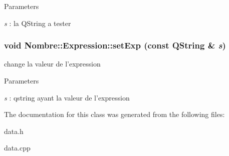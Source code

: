 \begin{DoxyParams}{Parameters}
\item[{\em s}]: la QString a tester \end{DoxyParams}
\hypertarget{classNombre_1_1Expression_a8e3eec9d859922798be932da57e5ce6e}{
\subsubsection[{setExp}]{\setlength{\rightskip}{0pt plus 5cm}void Nombre::Expression::setExp (const QString \& {\em s})}}
\label{classNombre_1_1Expression_a8e3eec9d859922798be932da57e5ce6e}


change la valeur de l'expression 


\begin{DoxyParams}{Parameters}
\item[{\em s}]: qstring ayant la valeur de l'expression \end{DoxyParams}


The documentation for this class was generated from the following files:\begin{DoxyCompactItemize}
\item 
data.h\item 
data.cpp\end{DoxyCompactItemize}
